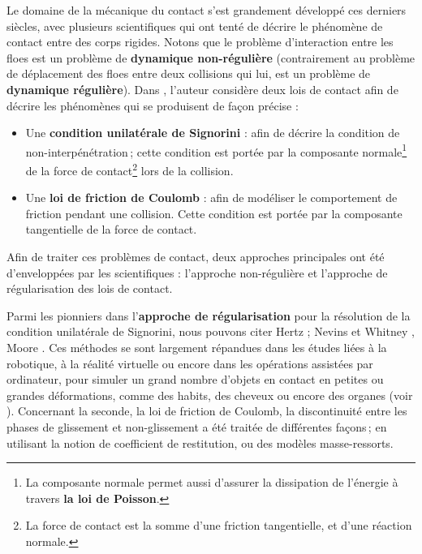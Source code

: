 Le domaine de la mécanique du contact s'est grandement développé ces derniers siècles, avec plusieurs scientifiques qui ont tenté de décrire le phénomène de contact entre des corps rigides. Notons que le problème d'interaction entre les floes est un problème de \textbf{dynamique non-régulière} (contrairement au problème de déplacement des floes entre deux collisions qui lui, est un problème de \textbf{dynamique régulière}). Dans \parencite{rabatel2015thesis}, l'auteur considère deux lois de contact afin de décrire les phénomènes qui se produisent de façon précise :
\begin{itemize}
    \item Une \textbf{condition unilatérale de Signorini} : afin de décrire la condition de non-interpénétration ; cette condition est portée par la composante normale\footnote{La composante normale permet aussi d'assurer la dissipation de l'énergie à travers \textbf{la loi de Poisson}.} de la force de contact\footnote{La force de contact est la somme d'une friction tangentielle, et d'une réaction normale.} lors de la collision.
    \item Une \textbf{loi de friction de Coulomb} : afin de modéliser le comportement de friction pendant une collision. Cette condition est portée par la composante tangentielle de la force de contact.
\end{itemize}

\noindent Afin de traiter ces problèmes de contact, deux approches principales ont été d'enveloppées par les scientifiques : l'approche non-régulière et l'approche de régularisation des lois de contact. 

Parmi les pionniers dans l'\textbf{approche de régularisation} pour la résolution de la condition unilatérale de Signorini, nous pouvons citer Hertz ; Nevins et Whitney \parencite{nevins1972force,whitney1977force}, Moore \parencite{moore1988collision}. Ces méthodes se sont largement répandues dans les études liées à la robotique, à la réalité virtuelle ou encore dans les opérations assistées par ordinateur, pour simuler un grand nombre d’objets en contact en petites ou grandes déformations, comme des habits, des cheveux ou encore des organes (voir \parencite{witkin1990fast,volino1995versatile,baraffandrew,raghupathi2004intestinal}). Concernant la seconde, la loi de friction de Coulomb, la discontinuité entre les phases de glissement et non-glissement a été traitée de différentes façons ; en utilisant la notion de coefficient de restitution, ou des modèles masse-ressorts. 
 
